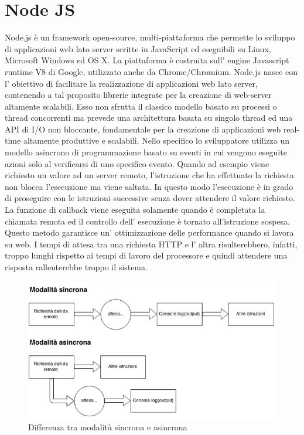 \section{Node JS}
\label{sec:chapter_tecnologie_abilitanti_nodejs}

Node.js è un framework open-source, multi-piattaforma che permette lo sviluppo di applicazioni web lato server scritte in JavaScript ed eseguibili su Linux, Microsoft Windows ed OS X.
La piattaforma è costruita sull’ engine Javascript runtime V8 di Google, utilizzato anche da Chrome/Chromium.
Node.js nasce con l’ obiettivo di facilitare la realizzazione di applicazioni web lato server, contenendo a tal proposito librerie integrate per la creazione di web-server altamente scalabili.
Esso non sfrutta il classico modello basato su processi o thread concorrenti ma prevede una architettura basata su singolo thread ed una API di I/O non bloccante, fondamentale per la creazione di applicazioni web real-time altamente produttive e scalabili.
Nello specifico lo sviluppatore utilizza un modello asincrono di programmazione basato su eventi in cui vengono eseguite azioni solo al verificarsi di uno specifico evento. 
Quando ad esempio viene richiesto un valore ad un server remoto, l’istruzione che ha effettuato la richiesta non blocca l’esecuzione ma viene saltata. 
In questo modo l’esecuzione è in grado di proseguire con le istruzioni successive senza dover attendere il valore richiesto.
La funzione di callback viene eseguita solamente quando è completata la chiamata remota ed il controllo dell’ esecuzione è tornato all’istruzione sospesa.
Questo metodo garantisce un’ ottimizzazione delle performance quando si lavora su web. 
I tempi di attesa tra una richiesta HTTP e l’ altra risulterebbero, infatti, troppo lunghi rispetto ai tempi di lavoro del processore e quindi attendere una risposta rallenterebbe troppo il sistema.
\\
\begin{figure}[htb]
 \centering
 \includegraphics[width=0.5\linewidth]{images/chapter_tecnologie_abilitanti/tecnologie_abilitanti_node_mod.png}\hfill
 \caption[NodeJS: modalità sincrona e asincrona]{Differenza tra modalità sincrona e asincrona}
 \label{fig:tecnologie_abilitanti_node_mod}
\end{figure}


